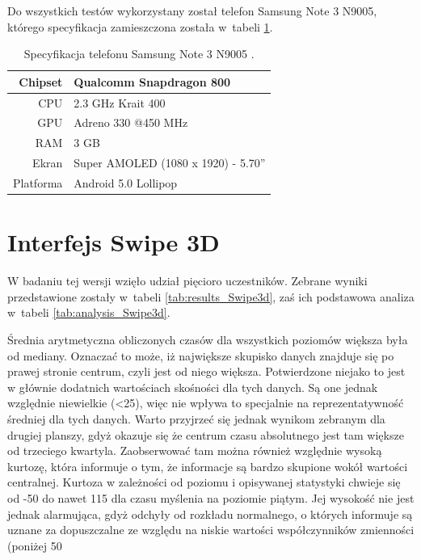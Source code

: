 \documentclass[a4paper,12pt,numbers=noenddot]{report}
\begin{document}
Do wszystkich testów wykorzystany został telefon Samsung Note 3 N9005, którego specyfikacja zamieszczona została w~tabeli \ref{tab:tab_telSpec}.

\begin{table}[H]
  \centering
  \caption{Specyfikacja telefonu Samsung Note 3 N9005 \cite{online_Note3Spec}.}
  \label{tab:tab_telSpec}
  \begin{tabular}{|r|l|}
    \hline
    Chipset & Qualcomm Snapdragon 800 \\
    \hline
    CPU & 2.3 GHz Krait 400\\
    \hline
    GPU & Adreno 330 @450 MHz\\
    \hline
    RAM & 3 GB\\
    \hline
    Ekran & Super AMOLED (1080 x 1920) - 5.70''\\
    \hline
    Platforma & Android 5.0 Lollipop\\
    \hline
  \end{tabular}
\end{table}


\section{Interfejs Swipe 3D}%
W badaniu tej wersji wzięło udział pięcioro uczestników. Zebrane wyniki przedstawione zostały w~tabeli \ref{tab:results_Swipe3d}, zaś ich podstawowa analiza w~tabeli \ref{tab:analysis_Swipe3d}. 

Średnia arytmetyczna obliczonych czasów dla wszystkich poziomów większa była od mediany. Oznaczać to może, iż największe skupisko danych znajduje się po prawej stronie centrum, czyli jest od niego większa. Potwierdzone niejako to jest w głównie dodatnich wartościach skośności dla tych danych. Są one jednak względnie niewielkie (<25), więc nie wpływa to specjalnie na reprezentatywność średniej dla tych danych. 
Warto przyjrzeć się jednak wynikom zebranym dla drugiej planszy, gdyż okazuje się że centrum czasu absolutnego jest tam większe od trzeciego kwartyla. Zaobserwować tam można również względnie wysoką kurtozę, która informuje o tym, że informacje są bardzo skupione wokół wartości centralnej.
Kurtoza w zależności od poziomu i opisywanej statystyki chwieje się od -50 do nawet 115 dla czasu myślenia na poziomie piątym. Jej wysokość nie jest jednak alarmująca, gdyż odchyły od rozkładu normalnego, o których informuje są uznane za dopuszczalne ze względu na niskie wartości współczynników zmienności (poniżej 50%
\end{document}
